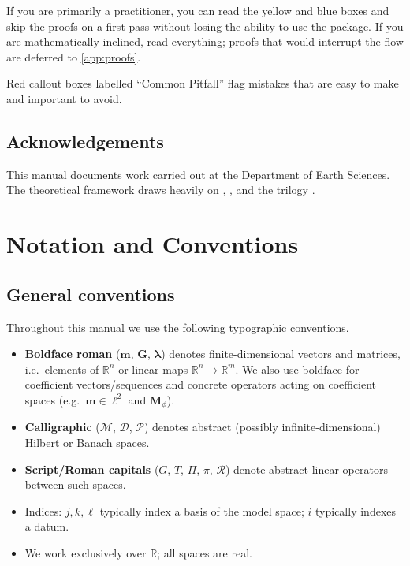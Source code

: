 \documentclass[11pt,twoside,openright]{book}
\theoremstyle{plain}
\theoremstyle{definition}
\theoremstyle{remark}
\begin{document}
If you are primarily a practitioner, you can read the yellow and blue
boxes and skip the proofs on a first pass without losing the ability to
use the package.
If you are mathematically inclined, read everything; proofs that would
interrupt the flow are deferred to \cref{app:proofs}.

Red callout boxes labelled ``Common Pitfall'' flag mistakes that are
easy to make and important to avoid.

\section*{Acknowledgements}

This manual documents work carried out at the Department of Earth
Sciences. The theoretical framework draws heavily on
\citet{al2021linear}, \citet{stuart2010inverse}, and the trilogy
\citet{backus1970inference,backus1970uniqueness,backus1970inferenceIII}.

\tableofcontents

\chapter{Notation and Conventions}
\label{notation}

\section*{General conventions}

Throughout this manual we use the following typographic conventions.

\begin{itemize}
  \item \textbf{Boldface roman} ($\mathbf{m}$, $\mathbf{G}$, $\boldsymbol{\lambda}$)
    denotes finite-dimensional vectors and matrices, i.e.\ elements of
    $\mathbb{R}^n$ or linear maps $\mathbb{R}^n \to \mathbb{R}^m$. We also use
    boldface for coefficient vectors/sequences and concrete operators acting on
    coefficient spaces (e.g.\ $\mathbf{m} \in \ell^2$ and $\mathbf{M}_\phi$).
  \item \textbf{Calligraphic} ($\mathcal{M}$, $\mathcal{D}$, $\mathcal{P}$)
    denotes abstract (possibly infinite-dimensional) Hilbert or Banach
    spaces.
  \item \textbf{Script/Roman capitals} ($G$, $T$, $\Pi$, $\pi$, $\mathcal{R}$)
    denote abstract linear operators between such spaces.
  \item Indices: $j,k,\ell$ typically index a basis of the model space;
    $i$ typically indexes a datum.
  \item We work exclusively over $\mathbb{R}$; all spaces are real.
\end{itemize}
\end{document}

